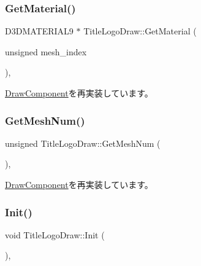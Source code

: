 \subsubsection{\texorpdfstring{Get\+Material()}{GetMaterial()}}
{\footnotesize\ttfamily D3\+D\+M\+A\+T\+E\+R\+I\+A\+L9 $\ast$ Title\+Logo\+Draw\+::\+Get\+Material (\begin{DoxyParamCaption}\item[{unsigned}]{mesh\+\_\+index }\end{DoxyParamCaption})\hspace{0.3cm}{\ttfamily [override]}, {\ttfamily [virtual]}}



\mbox{\hyperlink{class_draw_component_adae078d5139f691997763bf6cac9e25a}{Draw\+Component}}を再実装しています。

\mbox{\label{class_title_logo_draw_a882f0521f65845529e5bf45d3671d9c4}} 
\subsubsection{\texorpdfstring{Get\+Mesh\+Num()}{GetMeshNum()}}
{\footnotesize\ttfamily unsigned Title\+Logo\+Draw\+::\+Get\+Mesh\+Num (\begin{DoxyParamCaption}{ }\end{DoxyParamCaption})\hspace{0.3cm}{\ttfamily [override]}, {\ttfamily [virtual]}}



\mbox{\hyperlink{class_draw_component_a5f3bbcc8e563b740c0a5535170921c75}{Draw\+Component}}を再実装しています。

\mbox{\label{class_title_logo_draw_a9f70fb70639510908f4e07ee14667e30}} 
\subsubsection{\texorpdfstring{Init()}{Init()}}
{\footnotesize\ttfamily void Title\+Logo\+Draw\+::\+Init (\begin{DoxyParamCaption}{ }\end{DoxyParamCaption})\hspace{0.3cm}{\ttfamily [override]}, {\ttfamily [virtual]}}



